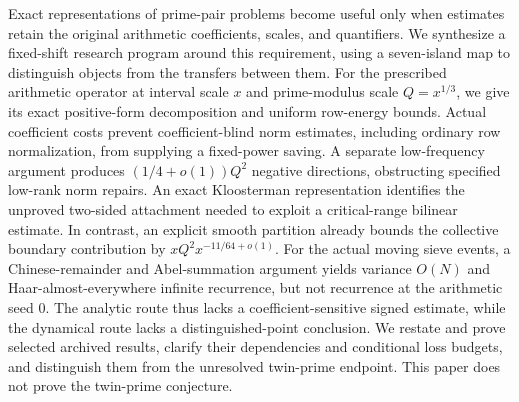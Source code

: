 Exact representations of prime-pair problems become useful only when estimates retain the original arithmetic coefficients, scales, and quantifiers. We synthesize a fixed-shift research program around this requirement, using a seven-island map to distinguish objects from the transfers between them. For the prescribed arithmetic operator at interval scale $x$ and prime-modulus scale $Q=x^{1/3}$, we give its exact positive-form decomposition and uniform row-energy bounds. Actual coefficient costs prevent coefficient-blind norm estimates, including ordinary row normalization, from supplying a fixed-power saving. A separate low-frequency argument produces $(1/4+o(1))Q^2$ negative directions, obstructing specified low-rank norm repairs. An exact Kloosterman representation identifies the unproved two-sided attachment needed to exploit a critical-range bilinear estimate. In contrast, an explicit smooth partition already bounds the collective boundary contribution by $xQ^2x^{-11/64+o(1)}$. For the actual moving sieve events, a Chinese-remainder and Abel-summation argument yields variance $O(N)$ and Haar-almost-everywhere infinite recurrence, but not recurrence at the arithmetic seed $0$. The analytic route thus lacks a coefficient-sensitive signed estimate, while the dynamical route lacks a distinguished-point conclusion. We restate and prove selected archived results, clarify their dependencies and conditional loss budgets, and distinguish them from the unresolved twin-prime endpoint. This paper does not prove the twin-prime conjecture.
